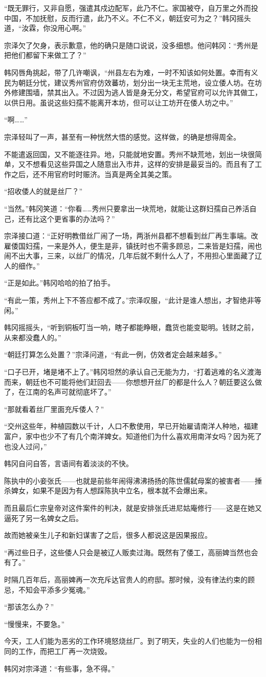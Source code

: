 “既无罪行，又非自愿，强遣其戍边配军，此乃不仁。家国被夺，自万里之外而投中国，不加抚慰，反而行遣，此乃不义。不仁不义，朝廷安可为之？”韩冈摇头道，“汝霖，你没用心啊。”

宗泽欠了欠身，表示歉意，他的确只是随口说说，没多细想。他问韩冈：“秀州是把他们都留下来做工了？”

韩冈唇角挑起，带了几许嘲讽，“州县左右为难，一时不知该如何处置。幸而有义民为朝廷分忧，建议秀州官府仿效蕃坊，划分出一块无主荒地，设立倭人坊。在坊外修建围墙，禁其出入。不过因为逃人皆是身无分文，希望官府可以允许其做工，以供日用。虽说这些妇孺不能离开本坊，但可以让工坊开在倭人坊之中。”

“啊……”

宗泽轻叫了一声，甚至有一种恍然大悟的感觉。这样做，的确是想得周全。

不能遣返回国，又不能逐往异。地，只能就地安置。秀州不缺荒地，划出一块很简单，又不想看见这些异国之人随意出入市井，这样的安排是最妥当的。而且有了工作之后，还不用官府时时赈济。当真是两全其美之策。

“招收倭人的就是丝厂？”

“当然。”韩冈笑道：“你看……秀州只要拿出一块荒地，就能让这群妇孺自己养活自己，还有比这个更省事的办法吗？”

宗泽接口道：“正好明教借丝厂闹了一场，两浙州县都不想看到丝厂再生事端。改雇倭国妇孺，一来是外人，便生是非，镇抚时也不需多顾忌，二来皆是妇孺，闹也闹不出大事，三来，以丝厂的情况，几年后就不剩什么人了，不用担心里面藏了辽人的细作。”

“正是如此。”韩冈哈哈的拍了拍手。

“有此一策，秀州上下不答应都不成了。”宗泽叹服，“此计是谁人想出，才智绝非等闲。”

韩冈摇摇头，“听到铜板叮当一响，瞎子都能睁眼，蠢货也能变聪明。钱财之前，从来都没蠢人的。”

“朝廷打算怎么处置？”宗泽问道，“有此一例，仿效者定会越来越多。”

“口子已开，堵是堵不上了。”韩冈坦然的承认自己无能为力，“打着逃难的名义渡海而来，朝廷也不可能将他们赶回去——你想想开丝厂的都是什么人？朝廷要这么做了，在江南的名声可就彻底坏了。”

“那就看着丝厂里面充斥倭人？”

“交州这些年，种植园数以千计，人口不敷使用，早已开始雇请南洋人种地，福建富户，家中也少不了有几个南洋婢女。知道他们为什么喜欢用南洋女吗？因为死了也没人过问，”

韩冈自问自答，言语间有着淡淡的不快。

陈执中的小妾张氏——也就是前些年闹得沸沸扬扬的陈世儒弑母案的被害者——捶杀婢女，如果不是因为有人想踩陈执中立名，根本就不会爆出来。

而且最后仁宗皇帝对这件案件的判决，就是安排张氏进尼姑庵修行——这是在她又逼死了另一名婢女之后。

故而她被亲生儿子和新妇谋害了之后，很多人都说这是因果报应。

“再过些日子，这些倭人只会是被辽人贩卖过海。既然有了倭工，高丽婢当然也会有了。”

时隔几百年后，高丽婢再一次充斥达官贵人的府邸。那时候，没有律法约束的顾忌，不知会平添多少冤魂。”

“那该怎么办？”

“慢慢来，不要急。”

今天，工人们能为恶劣的工作环境怒烧丝厂。到了明天，失业的人们也能为一份相同的工作，而把工厂再一次烧毁。

韩冈对宗泽道：“有些事，急不得。”
